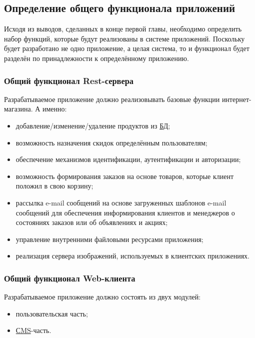 \subsection{Определение общего функционала приложений}\label{subsec:2-define-functionality}\indent

Исходя из выводов, сделанных в конце первой главы, необходимо определить набор функций, которые будут реализованы в системе приложений.
Поскольку будет разработано не одно приложение, а целая система, то и функционал будет разделён по принадлежности к определённому приложению.

\subsubsection{Общий функционал Rest-сервера}\indent

Разрабатываемое приложение должно реализовывать базовые функции интернет-магазина.
А именно:

\begin{itemize}
    \item добавление/изменение/удаление продуктов из \hyperlink{gloss:db}{БД};
    \item возможность назначения скидок определённым пользователям;
    \item обеспечение механизмов идентификации, аутентификации и авторизации;
    \item возможность формирования заказов на основе товаров, которые клиент положил в свою корзину;
    \item рассылка e-mail сообщений на основе загруженных шаблонов e-mail сообщений для обеспечения информирования клиентов и менеджеров о состояниях заказов или об объявлениях и акциях;
    \item управление внутренними файловыми ресурсами приложения;
    \item реализация сервера изображений, используемых в клиентских приложениях.
\end{itemize}

\subsubsection{Общий функционал Web-клиента}\indent

Разрабатываемое приложение должно состоять из двух модулей:

\begin{itemize}
    \item пользовательская часть;
    \item \hyperlink{gloss:cms}{СMS}-часть.
\end{itemize}

